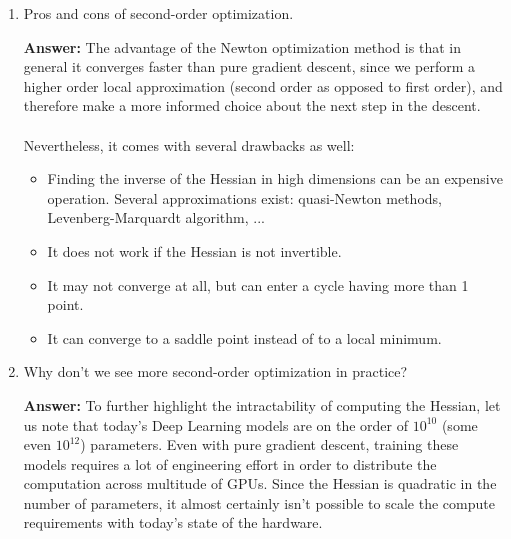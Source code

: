 \documentclass{article}
\newenvironment{QandA}{\begin{enumerate}[label=\arabic*.]}{\end{enumerate}}
\newenvironment{InnerQandA}{\begin{enumerate}[label=\roman*.]}{\end{enumerate}}
\newenvironment{answer}{\par\normalfont \textbf{Answer:}}{}
\begin{document}
\begin{QandA}
\begin{InnerQandA}
        \item Pros and cons of second-order optimization.
        \begin{answer}
            The advantage of the Newton optimization method is that in general it converges faster than pure gradient descent, since we perform a higher order local approximation (second order as opposed to first order), and therefore make a more informed choice about the next step in the descent. \\\\
            Nevertheless, it comes with several drawbacks as well:
            \begin{itemize}
                \item Finding the inverse of the Hessian in high dimensions can be an expensive operation. Several approximations exist: quasi-Newton methods, Levenberg-Marquardt algorithm, ...
                \item It does not work if the Hessian is not invertible.
                \item It may not converge at all, but can enter a cycle having more than 1 point.
                \item It can converge to a saddle point instead of to a local minimum.
            \end{itemize}
        \end{answer}

        \item Why don’t we see more second-order optimization in practice?
        \begin{answer}
            To further highlight the intractability of computing the Hessian, let us note that today's Deep Learning models are on the order of $10^{10}$ (some even $10^{12}$) parameters. Even with pure gradient descent, training these models requires a lot of engineering effort in order to distribute the computation across multitude of GPUs. Since the Hessian is quadratic in the number of parameters, it almost certainly isn't possible to scale the compute requirements with today's state of the hardware.
        \end{answer}

    \end{InnerQandA}


\end{QandA}
\end{document}
